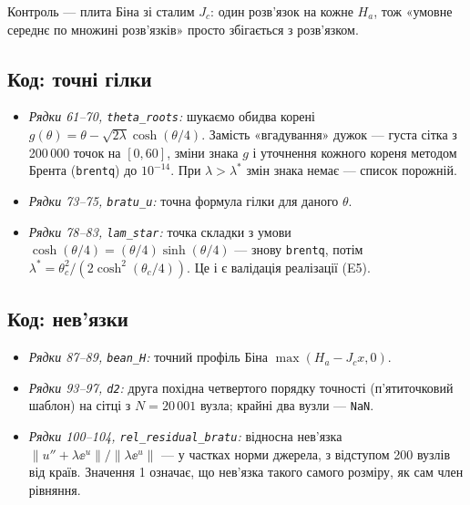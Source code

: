 Контроль --- плита Біна зі сталим $J_c$: один розв'язок на кожне $H_a$, тож «умовне
середнє по множині розв'язків» просто збігається з розв'язком.

\subsection{Код: точні гілки}


\begin{itemize}
\item \emph{Рядки 61--70, \texttt{theta\_roots}:} шукаємо обидва корені
  $g(\theta)=\theta-\sqrt{2\lambda}\cosh(\theta/4)$. Замість «вгадування» дужок --- густа
  сітка з 200\,000 точок на $[0,60]$, зміни знака $g$ і уточнення кожного кореня методом
  Брента (\texttt{brentq}) до $10^{-14}$. При $\lambda>\lambda^{*}$ змін знака немає ---
  список порожній.
\item \emph{Рядки 73--75, \texttt{bratu\_u}:} точна формула гілки для даного $\theta$.
\item \emph{Рядки 78--83, \texttt{lam\_star}:} точка складки з умови
  $\cosh(\theta/4)=(\theta/4)\sinh(\theta/4)$ --- знову \texttt{brentq}, потім
  $\lambda^{*}=\theta_c^2/(2\cosh^2(\theta_c/4))$. Це і є валідація реалізації (E5).
\end{itemize}

\subsection{Код: нев'язки}


\begin{itemize}
\item \emph{Рядки 87--89, \texttt{bean\_H}:} точний профіль Біна $\max(H_a-J_cx,0)$.
\item \emph{Рядки 93--97, \texttt{d2}:} друга похідна четвертого порядку точності
  (п'ятиточковий шаблон) на сітці з $N=20\,001$ вузла; крайні два вузли --- \texttt{NaN}.
\item \emph{Рядки 100--104, \texttt{rel\_residual\_bratu}:} відносна нев'язка
  $\|u''+\lambda\ee^{u}\|/\|\lambda\ee^{u}\|$ --- у частках норми джерела, з відступом
  200 вузлів від країв. Значення 1 означає, що нев'язка такого самого розміру, як сам
  член рівняння.
\end{itemize}

